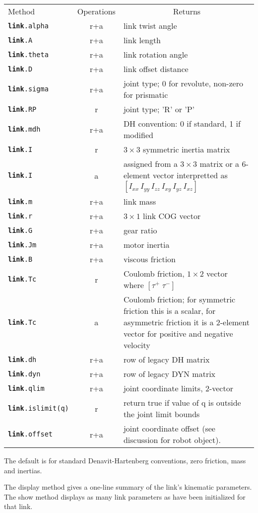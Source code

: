 \documentclass{article}
\newcommand{\var}[1]{{\vtt #1}}
\begin{document}
{\begin{center}
\begin{tabular}{lcp{6cm}}
Method          & Operations & \multicolumn{1}{c|}{Returns} \\
\tt \textbf{link}.alpha	&r+a&  link twist angle \\	
\tt \textbf{link}.A		&r+a&   link length \\
\tt \textbf{link}.theta	&r+a&   link rotation angle \\
\tt \textbf{link}.D		&r+a&   link offset distance \\
\tt \textbf{link}.sigma	&r+a&  joint type; 0 for revolute, non-zero for prismatic\\
\tt \textbf{link}.RP		&r&  joint type; 'R' or 'P'\\
\tt \textbf{link}.mdh	&r+a& DH convention: 0 if standard, 1 if modified\\ \hline
\tt \textbf{link}.I		&r& $3 \times 3$ symmetric inertia matrix\\
\tt \textbf{link}.I		&a& assigned from a $3 \times 3$  matrix or a 6-element vector
interpretted as $[I_{xx} \, I_{yy} \, I_{zz} \, I_{xy} \, I_{yz} \, I_{xz} ]$\\
\tt \textbf{link}.m		&r+a& link mass\\
\tt \textbf{link}.r		&r+a& $3 \times 1$ link COG vector \\ \hline
\tt \textbf{link}.G		&r+a& gear ratio\\
\tt \textbf{link}.Jm		&r+a& motor inertia\\
\tt \textbf{link}.B		&r+a& viscous friction\\
\tt \textbf{link}.Tc		&r& Coulomb friction, $1\times 2$ vector
where $[\tau^+ \; \tau^-]$\\ 
\tt \textbf{link}.Tc		&a& Coulomb friction; for symmetric friction
this is a scalar, for asymmetric friction it is a 2-element vector for
positive and negative velocity \\ \hline
\tt \textbf{link}.dh		&r+a&  row of legacy DH matrix \\
\tt \textbf{link}.dyn	&r+a& row of legacy DYN matrix \\
\tt \textbf{link}.qlim	&r+a& joint coordinate limits, 2-vector \\
\tt \textbf{link}.islimit(q)	&r& return true if value of \var{q} is outside
			the joint limit bounds\\
\tt \textbf{link}.offset	&r+a& joint coordinate offset (see discussion for
\var{robot} object).
\end{tabular}
\end{center} 

The default is for standard Denavit-Hartenberg conventions, zero friction,
mass and inertias.

The \var{display} method gives a one-line summary of the link's kinematic
parameters.
The \var{show} method displays as many link parameters as have been initialized
for that link.
}
\end{document}
